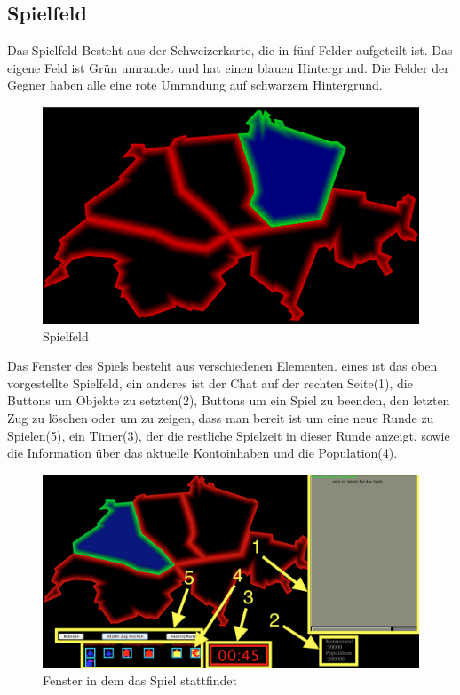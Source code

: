 \documentclass[ngerman, 12pt, pdftex]{scrartcl}[2006/07/30]
\begin{document}
\newpage

\subsection{Spielfeld}

Das Spielfeld Besteht aus der Schweizerkarte, die in fünf Felder aufgeteilt ist. Das eigene Feld ist Grün umrandet und hat einen blauen Hintergrund. Die Felder der Gegner haben alle eine rote Umrandung auf schwarzem Hintergrund.

\begin{figure}[h]
\centering
\includegraphics[scale=0.3]{spiel/spielfeld.png}
\caption{Spielfeld}
\end{figure}

Das Fenster des Spiels besteht aus verschiedenen Elementen. eines ist das oben vorgestellte Spielfeld, ein anderes ist der Chat auf der rechten Seite(1), die Buttons um Objekte zu setzten(2),
Buttons um ein Spiel zu beenden, den letzten Zug zu löschen oder um zu zeigen, dass man bereit ist um eine neue Runde zu Spielen(5), ein Timer(3), der die restliche Spielzeit in dieser Runde anzeigt, sowie die Information über das aktuelle Kontoinhaben und die Population(4).

\begin{figure}[h]
\centering
\includegraphics[scale=0.3]{spiel/spielfenster.png}
\caption{Fenster in dem das Spiel stattfindet}
\end{figure}
\end{document}

